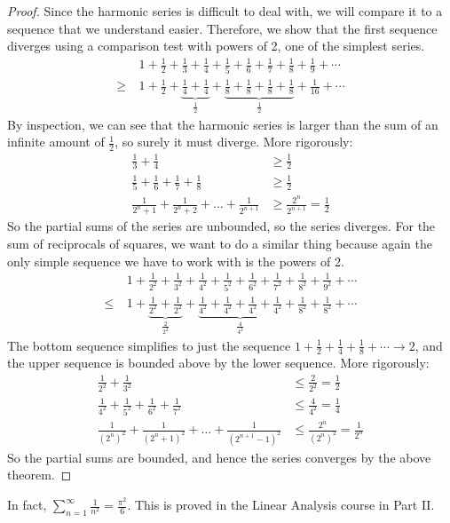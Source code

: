 \begin{proof}
	Since the harmonic series is difficult to deal with, we will compare it to a sequence that we understand easier.
	Therefore, we show that the first sequence diverges using a comparison test with powers of 2, one of the simplest series.
	\begin{align*}
		       & 1 + \frac 1 2 + \frac 1 3 + \frac 1 4 + \frac 1 5 + \frac 1 6 + \frac 1 7 + \frac 1 8 + \frac 1 9 + \cdots                                                      \\
		\geq\  & 1 + \frac 1 2 + \underbrace{\frac 1 4 + \frac 1 4}_{\frac 1 2} + \underbrace{\frac 1 8 + \frac 1 8 + \frac 1 8 + \frac 1 8}_{\frac 1 2} + \frac 1 {16} + \cdots
	\end{align*}
	By inspection, we can see that the harmonic series is larger than the sum of an infinite amount of \(\frac 1 2\), so surely it must diverge.
	More rigorously:
	\begin{align*}
		\frac 1 3 + \frac 1 4                                              & \geq \frac 1 2                         \\
		\frac 1 5 + \frac 1 6 + \frac 1 7 + \frac 1 8                      & \geq \frac 1 2                         \\
		\frac{1}{2^n + 1} + \frac{1}{2^n + 2} + \dots + \frac{1}{2^{n+1}} & \geq \frac{2^n}{2^{n+1}} = \frac{1}{2}
	\end{align*}
	So the partial sums of the series are unbounded, so the series diverges.
	For the sum of reciprocals of squares, we want to do a similar thing because again the only simple sequence we have to work with is the powers of 2.
	\begin{align*}
		       & 1 + \frac 1 {2^2} + \frac 1 {3^2} + \frac 1 {4^2} + \frac 1 {5^2} + \frac 1 {6^2} + \frac 1 {7^2} + \frac 1 {8^2} + \frac 1 {9^2} + \cdots                                                           \\
		\leq\  & 1 + \underbrace{\frac 1 {2^2} + \frac 1 {2^2}}_{\frac 2 {2^2}} + \underbrace{\frac 1 {4^2} + \frac 1 {4^2} + \frac 1 {4^2} + \frac 1 {4^2}}_{\frac 4 {4^2}} + \frac 1 {8^2} + \frac 1 {8^2} + \cdots
	\end{align*}
	The bottom sequence simplifies to just the sequence \(1 + \frac{1}{2} + \frac{1}{4} + \frac{1}{8} + \cdots \to 2\), and the upper sequence is bounded above by the lower sequence.
	More rigorously:
	\begin{align*}
		\frac{1}{2^2} + \frac{1}{3^2}                                                & \leq \frac{2}{2^2} = \frac{1}{2}         \\
		\frac{1}{4^2} + \frac{1}{5^2} + \frac{1}{6^2} + \frac{1}{7^2}                & \leq \frac{4}{4^2} = \frac{1}{4}         \\
		\frac{1}{(2^n)^2} + \frac{1}{(2^n + 1)^2} + \dots + \frac{1}{(2^{n+1}-1)^2} & \leq \frac{2^n}{(2^n)^2} = \frac{1}{2^n}
	\end{align*}
	So the partial sums are bounded, and hence the series converges by the above theorem.
\end{proof}
In fact, \(\sum_{n=1}^\infty \frac{1}{n^2} = \frac{\pi^2}{6}\).
This is proved in the Linear Analysis course in Part II.\@

